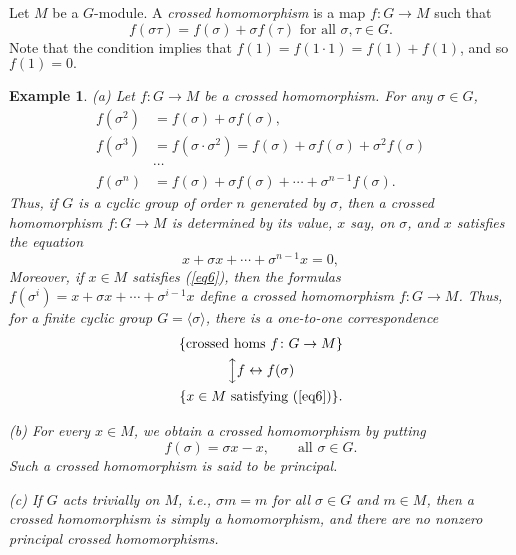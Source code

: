 \documentclass[a4paper,11pt,final,openany]{memoir}
\newtheorem{example}[X]{Example}
\theoremstyle{nonumberplain}
\begin{document}
Let $M$ be a $G$-module. A \emph{crossed homomorphism\/}%
is a map $f\colon G\rightarrow M$ such that
\[
f(\sigma\tau)=f(\sigma)+\sigma f(\tau)\text{ for all }\sigma,\tau\in G\text{.}%
\]
Note that the condition implies that $f(1)=f(1\cdot1)=f(1)+f(1)$, and so
$f(1)=0.$

\begin{example}
\label{ag16} (a) Let $f\colon G\rightarrow M$ be a crossed homomorphism. For
any $\sigma\in G$,
\begin{align*}
f(\sigma^{2})  &  =f(\sigma)+\sigma f(\sigma),\\
f(\sigma^{3})  &  =f(\sigma\cdot\sigma^{2})=f(\sigma)+\sigma f(\sigma
)+\sigma^{2}f(\sigma)\\
&  \cdots\\
f(\sigma^{n})  &  =f(\sigma)+\sigma f(\sigma)+\cdots+\sigma^{n-1}f(\sigma).
\end{align*}
Thus, if $G$ is a cyclic group of order $n$ generated by $\sigma$, then a
crossed homomorphism $f\colon G\rightarrow M$ is determined by its value, $x$
say, on $\sigma$, and $x$ satisfies the equation
\begin{equation}
x+\sigma x+\cdots+\sigma^{n-1}x=0, \label{eq6}%
\end{equation}
Moreover, if $x\in M$ satisfies (\ref{eq6}), then the formulas $f(\sigma
^{i})=x+\sigma x+\cdots+\sigma^{i-1}x$ define a crossed homomorphism $f\colon
G\rightarrow M$. Thus, for a finite cyclic group $G=\langle\sigma\rangle$,
there is a one-to-one correspondence
\begin{gather*}
\{\text{crossed homs }f\colon G\rightarrow M\}\\
\Big\updownarrow {f\leftrightarrow
f(\sigma)}\\
\{x\in M\text{\ satisfying (\ref{eq6})}\}.
\end{gather*}


(b) For every $x\in M$, we obtain a crossed homomorphism by putting
\[
f(\sigma)=\sigma x-x,\qquad\text{all }\sigma\in G.
\]
Such a crossed homomorphism is said to be \emph{principal}.
%


(c) If $G$ acts trivially on $M$, i.e., $\sigma m=m$ for all $\sigma\in G$ and
$m\in M$, then a crossed homomorphism is simply a homomorphism, and there are
no nonzero principal crossed homomorphisms.
\end{example}
\end{document}
